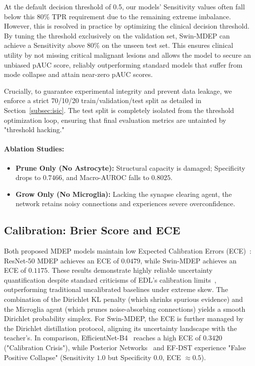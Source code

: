 \documentclass[letterpaper]{article} %
\begin{document}
At the default decision threshold of 0.5, our models' Sensitivity values often fall below this 80\% TPR requirement due to the remaining extreme imbalance. However, this is resolved in practice by optimizing the clinical decision threshold. By tuning the threshold exclusively on the validation set, Swin-MDEP can achieve a Sensitivity above 80\% on the unseen test set. This ensures clinical utility by not missing critical malignant lesions and allows the model to secure an unbiased pAUC score, reliably outperforming standard models that suffer from mode collapse and attain near-zero pAUC scores.

Crucially, to guarantee experimental integrity and prevent data leakage, we enforce a strict 70/10/20 train/validation/test split as detailed in Section~\ref{subsec:isic}. The test split is completely isolated from the threshold optimization loop, ensuring that final evaluation metrics are untainted by "threshold hacking."

\paragraph{Ablation Studies:}
\begin{itemize}
    \item \textbf{Prune Only (No Astrocyte):} Structural capacity is damaged; Specificity drops to $0.7466$, and Macro-AUROC falls to $0.8025$.
    \item \textbf{Grow Only (No Microglia):} Lacking the synapse clearing agent, the network retains noisy connections and experiences severe overconfidence.
\end{itemize}

\subsection{Calibration: Brier Score and ECE}\label{subsec:calibration}

Both proposed MDEP models maintain low Expected Calibration Errors (ECE)~\cite{naeini2015obtaining}: ResNet-50 MDEP achieves an ECE of $0.0479$, while Swin-MDEP achieves an ECE of $0.1175$. These results demonstrate highly reliable uncertainty quantification despite standard criticisms of EDL's calibration limits~\cite{shen2024mirage}, outperforming traditional uncalibrated baselines under extreme skew. The combination of the Dirichlet KL penalty (which shrinks spurious evidence) and the Microglia agent (which prunes noise-absorbing connections) yields a smooth Dirichlet probability simplex. For Swin-MDEP, the ECE is further managed by the Dirichlet distillation protocol, aligning its uncertainty landscape with the teacher's. In comparison, EfficientNet-B4~\cite{tan2019efficientnet} reaches a high ECE of $0.3420$ ("Calibration Crisis"), while Posterior Networks~\cite{charpentier2020posterior} and EF-DST experience "False Positive Collapse" (Sensitivity $1.0$ but Specificity $0.0$, ECE $\approx 0.5$).
\end{document}
